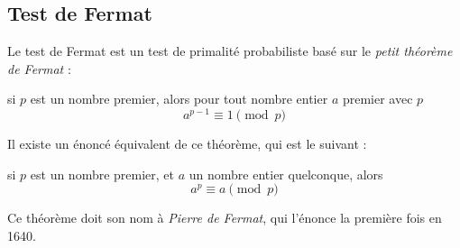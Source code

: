 \subsection{Test de Fermat}
	Le test de Fermat est un test de primalité probabiliste basé sur le \textit{petit théorème de Fermat} :
	
	\vspace{-1.5em}\begin{adjustwidth}{1.5cm}{1.5cm} 
	\begin{Th}
		\label{ThFermat}
		si $p$ est un nombre premier, alors pour tout nombre entier $a$ premier avec $p$
		\[a^{p-1}\equiv 1 \pmod p\]
	\end{Th}
	\end{adjustwidth}\vspace{0.5em}
	
	Il existe un énoncé équivalent de ce théorème, qui est le suivant :
	
	\vspace{-1.5em}\begin{adjustwidth}{1.5cm}{1.5cm} 
	\begin{Th}
		\label{ThFermat}
		si $p$ est un nombre premier, et $a$ un nombre entier quelconque, alors
		\[a^{p}\equiv a \pmod p\]
	\end{Th}
	\end{adjustwidth}\vspace{0.5em}
	
	Ce théorème doit son nom à \textit{Pierre de Fermat}, qui l'énonce la première fois en 1640. 
	
